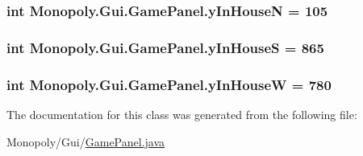\subsubsection[{\texorpdfstring{y\+In\+HouseN}{yInHouseN}}]{\setlength{\rightskip}{0pt plus 5cm}int Monopoly.\+Gui.\+Game\+Panel.\+y\+In\+HouseN = 105\hspace{0.3cm}{\ttfamily [private]}}\hypertarget{class_monopoly_1_1_gui_1_1_game_panel_ae43dfa7b6bbe50bfcf6aedae15300948}{}\label{class_monopoly_1_1_gui_1_1_game_panel_ae43dfa7b6bbe50bfcf6aedae15300948}
\subsubsection[{\texorpdfstring{y\+In\+HouseS}{yInHouseS}}]{\setlength{\rightskip}{0pt plus 5cm}int Monopoly.\+Gui.\+Game\+Panel.\+y\+In\+HouseS = 865\hspace{0.3cm}{\ttfamily [private]}}\hypertarget{class_monopoly_1_1_gui_1_1_game_panel_aba9060000ece3843dcdb7c7760aa931c}{}\label{class_monopoly_1_1_gui_1_1_game_panel_aba9060000ece3843dcdb7c7760aa931c}
\subsubsection[{\texorpdfstring{y\+In\+HouseW}{yInHouseW}}]{\setlength{\rightskip}{0pt plus 5cm}int Monopoly.\+Gui.\+Game\+Panel.\+y\+In\+HouseW = 780\hspace{0.3cm}{\ttfamily [private]}}\hypertarget{class_monopoly_1_1_gui_1_1_game_panel_a13b869ff6b15a120ea34a3d49265cd03}{}\label{class_monopoly_1_1_gui_1_1_game_panel_a13b869ff6b15a120ea34a3d49265cd03}


The documentation for this class was generated from the following file\+:\begin{DoxyCompactItemize}
\item 
Monopoly/\+Gui/\hyperlink{_game_panel_8java}{Game\+Panel.\+java}\end{DoxyCompactItemize}
